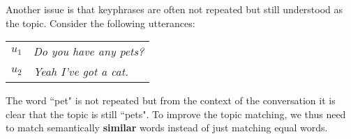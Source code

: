 Another issue is that \glspl{keyphrase} are often not repeated but still understood as the topic. Consider the following \glspl{utterance}:

\begin{table}[h]
    \begin{tabular}{l|l}
    $u_1$     & \textit{Do you have any pets?}                    \\
    $u_2$     & \textit{Yeah I've got a cat.}                        \\
    \end{tabular}
\end{table}

The word ``pet" is not repeated  but from the context of the conversation it is clear that the topic is still ``pets". To improve the topic matching, we thus need to match semantically \textbf{similar} words instead of just matching equal words.
